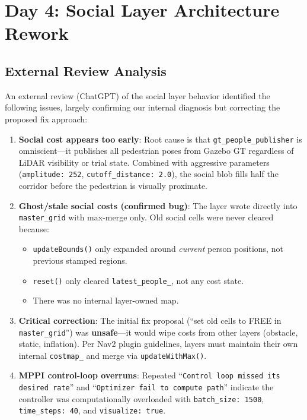 \documentclass[11pt]{article}
\newcommand{\logentry}[1]{\subsection*{#1}}
\begin{document}
\section{Day 4: Social Layer Architecture Rework}

\logentry{External Review Analysis}
An external review (ChatGPT) of the social layer behavior identified the following
issues, largely confirming our internal diagnosis but correcting the proposed fix
approach:

\begin{enumerate}
  \item \textbf{Social cost appears too early}: Root cause is that
    \texttt{gt\_people\_publisher} is omniscient---it publishes all pedestrian
    poses from Gazebo GT regardless of LiDAR visibility or trial state.
    Combined with aggressive parameters (\texttt{amplitude: 252},
    \texttt{cutoff\_distance: 2.0}), the social blob fills half the corridor
    before the pedestrian is visually proximate.
  \item \textbf{Ghost/stale social costs (confirmed bug)}: The layer wrote
    directly into \texttt{master\_grid} with max-merge only. Old social cells
    were never cleared because:
    \begin{itemize}
      \item \texttt{updateBounds()} only expanded around \emph{current} person
        positions, not previous stamped regions.
      \item \texttt{reset()} only cleared \texttt{latest\_people\_}, not any
        cost state.
      \item There was no internal layer-owned map.
    \end{itemize}
  \item \textbf{Critical correction}: The initial fix proposal (``set old cells
    to FREE in \texttt{master\_grid}'') was \textbf{unsafe}---it would wipe
    costs from other layers (obstacle, static, inflation). Per Nav2 plugin
    guidelines, layers must maintain their own internal \texttt{costmap\_} and
    merge via \texttt{updateWithMax()}.
  \item \textbf{MPPI control-loop overruns}: Repeated
    ``\texttt{Control loop missed its desired rate}'' and
    ``\texttt{Optimizer fail to compute path}'' indicate the controller was
    computationally overloaded with \texttt{batch\_size: 1500},
    \texttt{time\_steps: 40}, and \texttt{visualize: true}.
\end{enumerate}
\end{document}
